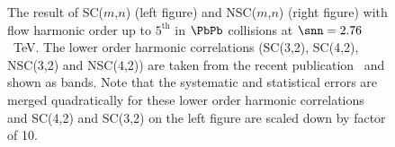 \begin{figure}[htbp]
            \begin{center}
        \caption{The result of SC($m$,$n$) (left figure) and NSC($m$,$n$) (right figure) with flow harmonic order up to $5^{\mathrm{th}}$ in $\PbPb$ collisions at $\snn=2.76$~TeV. The lower order harmonic correlations (SC(3,2), SC(4,2), NSC(3,2) and NSC(4,2)) are taken from the recent publication~\cite{ALICE:2016kpq} and shown as bands. Note that the systematic and statistical errors are merged quadratically for these lower order harmonic correlations  and SC(4,2) and SC(3,2) on the left figure are scaled down by factor of 10.}
        \label{fig:Figure_1}
              \end{center}
\end{figure}

